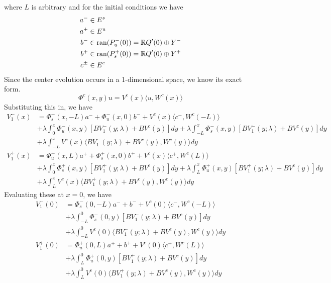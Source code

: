 \documentclass[thesis.tex]{subfiles}
\begin{document}
where $L$ is arbitrary and for the initial conditions we have
\begin{align*}
a^- &\in E^s \\
a^+ &\in E^u \\
b^- &\in \text{ran}(P_u^-(0)) = {\mathbb R} Q'(0) \oplus Y^- \\
b^+ &\in \text{ran}(P_s^+(0)) = {\mathbb R} Q'(0) \oplus Y^+ \\
c^\pm &\in E^c \\
\end{align*}
Since the center evolution occurs in a 1-dimensional space, we know its exact form.
\[
\Phi^c(x, y) u = V^c(x)\langle u, W^c(x)\rangle
\]
Substituting this in, we have
\begin{equation*}
\begin{aligned}
V_1^-(x) &= \Phi_s^-(x, -L) a^- + \Phi_u^-(x, 0) b^- + V^c(x)\langle c^-, W^c(-L)\rangle \\
&+ \lambda \int_0^x \Phi_u^-(x, y) [B V_1^-(y; \lambda) + B V^c(y)] dy + \lambda \int_{-L}^x \Phi_s^-(x, y)[B V_1^-(y; \lambda) + B V^c(y)] dy \\
&+ \lambda \int_{-L}^x V^c(x)\langle B V_1^-(y; \lambda) + B V^c(y), W^c(y) \rangle dy \\ 
V_1^+(x) &= \Phi_u^+(x, L) a^+ + \Phi_s^+(x, 0) b^+ + V^c(x)\langle c^+, W^c(L)\rangle \\
&+ \lambda \int_0^x \Phi_s^+(x, y)[B V_1^+(y; \lambda) + B V^c(y)] dy
+ \lambda \int_{L}^x \Phi_u^+(x, y)[B V_1^+(y; \lambda) + B V^c(y)] dy \\
&+ \lambda \int_{L}^x V^c(x) \langle B V_1^+(y; \lambda) + B V^c(y), W^c(y) \rangle  dy
\end{aligned}
\end{equation*}
Evaluating these at $x = 0$, we have
\begin{equation*}
\begin{aligned}
V_1^-(0) &= \Phi_s^-(0, -L) a^- + b^- + V^c(0)\langle c^-, W^c(-L)\rangle \\
&+ \lambda \int_{-L}^0 \Phi_s^-(0, y)[B V_1^-(y; \lambda) + B V^c(y)] dy \\
&+ \lambda \int_{-L}^0 V^c(0)\langle B V_1^-(y; \lambda) + B V^c(y), W^c(y) \rangle dy \\ 
V_1^+(0) &= \Phi_u^+(0, L) a^+ + b^+ + V^c(0)\langle c^+, W^c(L)\rangle \\
&+ \lambda \int_{L}^0 \Phi_u^+(0, y)[B V_1^+(y; \lambda) + B V^c(y)] dy \\
&+ \lambda \int_{L}^0 V^c(0) \langle B V_1^+(y; \lambda) + B V^c(y), W^c(y) \rangle  dy
\end{aligned}
\end{equation*}
\end{document}
